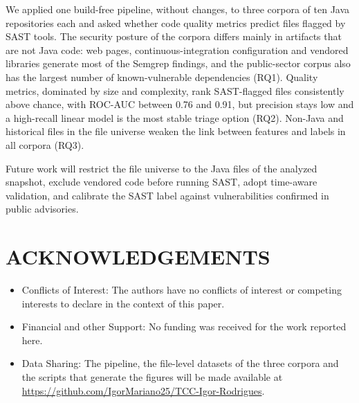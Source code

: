 \documentclass[a4paper,twoside]{article}
\begin{document}
We applied one build-free pipeline, without changes, to three corpora of ten Java repositories each and asked whether code quality metrics predict files flagged by SAST tools. The security posture of the corpora differs mainly in artifacts that are not Java code: web pages, continuous-integration configuration and vendored libraries generate most of the Semgrep findings, and the public-sector corpus also has the largest number of known-vulnerable dependencies (RQ1). Quality metrics, dominated by size and complexity, rank SAST-flagged files consistently above chance, with ROC-AUC between 0.76 and 0.91, but precision stays low and a high-recall linear model is the most stable triage option (RQ2). Non-Java and historical files in the file universe weaken the link between features and labels in all corpora (RQ3).

Future work will restrict the file universe to the Java files of the analyzed snapshot, exclude vendored code before running SAST, adopt time-aware validation, and calibrate the SAST label against vulnerabilities confirmed in public advisories.

\section*{\uppercase{Acknowledgements}}

\begin{itemize}
  \item Conflicts of Interest: The authors have no conflicts of interest or competing interests to declare in the context of this paper.
  \item Financial and other Support: No funding was received for the work reported here.
  \item Data Sharing: The pipeline, the file-level datasets of the three corpora and the scripts that generate the figures will be made available at \url{https://github.com/IgorMariano25/TCC-Igor-Rodrigues}.
\end{itemize}


{\small
}
\end{document}
